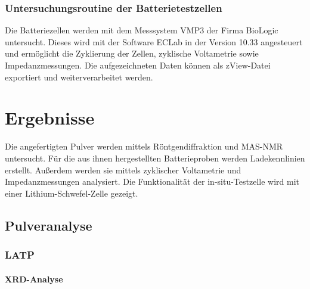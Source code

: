 \documentclass[a4paper, 11pt, headsepline,footsepline,twoside,abstract]{scrbook}
\begin{document}
\subsection{Untersuchungsroutine der Batterietestzellen}
Die Batteriezellen werden mit dem Messsystem VMP3 der Firma BioLogic untersucht. Dieses wird mit der Software ECLab in der Version 10.33 angesteuert und ermöglicht die Zyklierung der Zellen, zyklische Voltametrie sowie Impedanzmessungen. Die aufgezeichneten Daten können als zView-Datei exportiert und weiterverarbeitet werden.
\chapter{Ergebnisse}
Die angefertigten Pulver werden mittels Röntgendiffraktion und MAS-NMR untersucht. Für die aus ihnen hergestellten Batterieproben werden Ladekennlinien erstellt. Außerdem werden sie mittels zyklischer Voltametrie und Impedanzmessungen analysiert. Die Funktionalität der in-situ-Testzelle wird mit einer Lithium-Schwefel-Zelle gezeigt.
\section{Pulveranalyse}
\subsection{LATP}
\subsubsection{XRD-Analyse}
\end{document}

